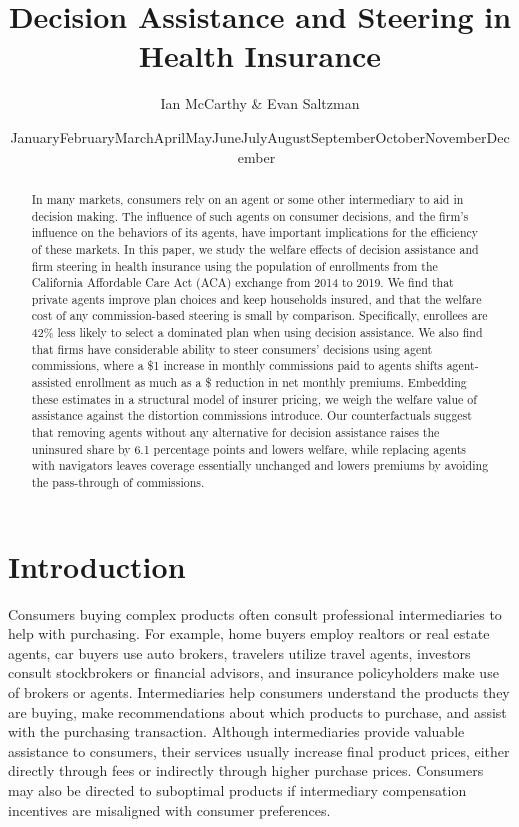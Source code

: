 \documentclass[12pt]{article}
\newcommand{\monthyear}{\ifcase\month\or January\or February\or March\or April\or May\or June\or July\or August\or September\or October\or November\or December\fi\ \the\year}
\begin{document}
\title{Decision Assistance and Steering in Health Insurance}
\author{Ian McCarthy \& Evan Saltzman}
\date{\monthyear}
\maketitle

\vspace{-2ex}
\begin{abstract}
\noindent In many markets, consumers rely on an agent or some other intermediary to aid in decision making. The influence of such agents on consumer decisions, and the firm's influence on the behaviors of its agents, have important implications for the efficiency of these markets. In this paper, we study the welfare effects of decision assistance and firm steering in health insurance using the population of enrollments from the California Affordable Care Act (ACA) exchange from 2014 to 2019. We find that private agents improve plan choices and keep households insured, and that the welfare cost of any commission-based steering is small by comparison. Specifically, enrollees are 42\% less likely to select a dominated plan when using decision assistance. We also find that firms have considerable ability to steer consumers' decisions using agent commissions, where a \$1 increase in monthly commissions paid to agents shifts agent-assisted enrollment as much as a \$\commPremRatio{} reduction in net monthly premiums. Embedding these estimates in a structural model of insurer pricing, we weigh the welfare value of assistance against the distortion commissions introduce. Our counterfactuals suggest that removing agents without any alternative for decision assistance raises the uninsured share by 6.1 percentage points and lowers welfare, while replacing agents with navigators leaves coverage essentially unchanged and lowers premiums by avoiding the pass-through of commissions.
\end{abstract}

\clearpage

\section{Introduction}
\label{sec:introduction}



Consumers buying complex products often consult professional intermediaries to help with purchasing. For example, home buyers employ realtors or real estate agents, car buyers use auto brokers, travelers utilize travel agents, investors consult stockbrokers or financial advisors, and insurance policyholders make use of brokers or agents. Intermediaries help consumers understand the products they are buying, make recommendations about which products to purchase, and assist with the purchasing transaction. Although intermediaries provide valuable assistance to consumers, their services usually increase final product prices, either directly through fees or indirectly through higher purchase prices. Consumers may also be directed to suboptimal products if intermediary compensation incentives are misaligned with consumer preferences.
\end{document}
